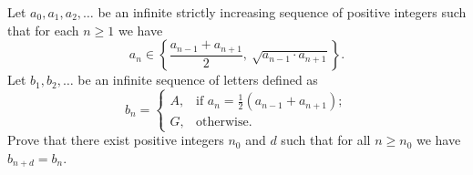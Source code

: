 Let $a_0, a_1, a_2, \ldots$ be an infinite strictly increasing sequence of positive integers such that for each $n \geq 1$ we have
\[ a_n \in \left\{ \frac{a_{n-1} + a_{n+1}}{2},\ \sqrt{a_{n-1} \cdot a_{n+1}} \right\}. \]
Let $b_1, b_2, \ldots$ be an infinite sequence of letters defined as
\[ b_n = \begin{cases} A, & \text{if } a_n = \tfrac{1}{2}(a_{n-1} + a_{n+1}); \\ G, & \text{otherwise.} \end{cases} \]
Prove that there exist positive integers $n_0$ and $d$ such that for all $n \geq n_0$ we have $b_{n+d} = b_n$.
